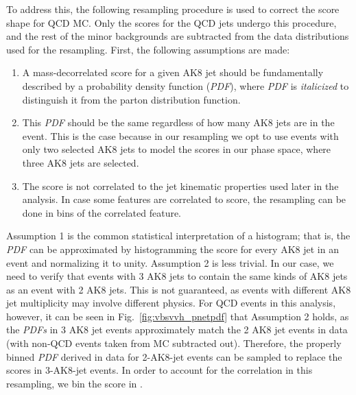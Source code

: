 To address this, the following resampling procedure is used to correct the \ParticleNet score shape for QCD MC. 
Only the scores for the QCD jets undergo this procedure, and the rest of the minor backgrounds are subtracted from the data distributions used for the resampling.
First, the following assumptions are made:
\begin{enumerate}
    \item A mass-decorrelated \ParticleNet score for a given AK8 jet should be fundamentally described by a probability density function (\textit{PDF}), where \textit{PDF} is \textit{italicized} to distinguish it from the parton distribution function.
    \item This \textit{PDF} should be the same regardless of how many AK8 jets are in the event. This is the case because in our resampling we opt to use events with only two selected AK8 jets to model the scores in our phase space, where three AK8 jets are selected.
    \item The \ParticleNet score is not correlated to the jet kinematic properties used later in the analysis. In case some features are correlated to \ParticleNet score, the resampling can be done in bins of the correlated feature.
\end{enumerate}
Assumption 1 is the common statistical interpretation of a histogram; that is, the \textit{PDF} can be approximated by histogramming the \ParticleNet score for every AK8 jet in an event and normalizing it to unity. 
Assumption 2 is less trivial. 
In our case, we need to verify that events with 3 AK8 jets to contain the same kinds of AK8 jets as an event with 2 AK8 jets. 
This is not guaranteed, as events with different AK8 jet multiplicity may involve different physics. 
For QCD events in this analysis, however, it can be seen in Fig.~\ref{fig:vbsvvh_pnetpdf} that Assumption 2 holds, as the \textit{PDFs} in 3 AK8 jet events approximately match the 2 AK8 jet events in data (with non-QCD events taken from MC subtracted out).
Therefore, the properly binned \textit{PDF} derived in data for 2-AK8-jet events can be sampled to replace the \ParticleNet scores in 3-AK8-jet events. 
In order to account for the correlation in this resampling, we bin the \ParticleNet \Xtobb score in \pt. 

